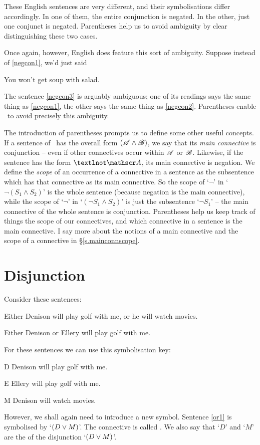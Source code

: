 These English sentences are very different, and their symbolisations differ accordingly. In one of them, the entire conjunction is negated. In the other, just one conjunct is negated. Parentheses help us to avoid ambiguity by clear distinguishing these two cases.

Once again, however, English does feature this sort of ambiguity. Suppose instead of \ref{negcon1}, we'd just said \begin{earg}
	\item[\ex{negcon3}] You won't get soup with salad.
\end{earg}
The sentence \ref{negcon3} is arguably ambiguous; one of its readings says the same thing as \ref{negcon1}, the other says the same thing as \ref{negcon2}. Parentheses enable \TFL\ to avoid precisely this ambiguity.

The introduction of parentheses prompts us to define some other useful concepts. If a sentence of \TFL\ has the overall form $(\mathscr{A} \wedge \mathscr{B})$, we say that its \emph{main connective} is conjunction – even if other connectives occur within $\mathscr{A}$ or $\mathscr{B}$. Likewise, if the sentence has the form $¬\meta{A}$, its main connective is negation. We define the \emph{scope} of an occurrence of a connective in a sentence as the subsentence which has that connective as its main connective. So the scope of `$¬$' in `$¬(S_{1} \wedge S_{2})$' is the whole sentence (because negation is the main connective), while the scope of `$¬$' in `$(¬S_{1}\wedge S_{2})$' is just the subsentence `$¬S_{1}$' – the main connective of the whole sentence is conjunction. Parentheses help us keep track of things the scope of our connectives, and which connective in a sentence is the main connective. I say more about the notions of a main connective and the scope of a connective in §\ref{s.mainconnscope}.

\section{Disjunction}
Consider these sentences:
	\begin{earg}
		\item[\ex{or1}]Either Denison will play golf with me, or he will watch movies.
		\item[\ex{or2}]Either Denison or Ellery will play golf with me. 
	\end{earg}
For these sentences we can use this symbolisation key:
	\begin{ekey}
		\item[D] Denison will play golf with me.
		\item[E] Ellery will play golf with me.
		\item[M] Denison will watch movies.
	\end{ekey}
However, we shall again need to introduce a new symbol. Sentence \ref{or1} is symbolised by `$(D \vee M)$'. The connective is called . We also say that `$D$' and `$M$' are the  of the disjunction `$(D \vee M)$'.

